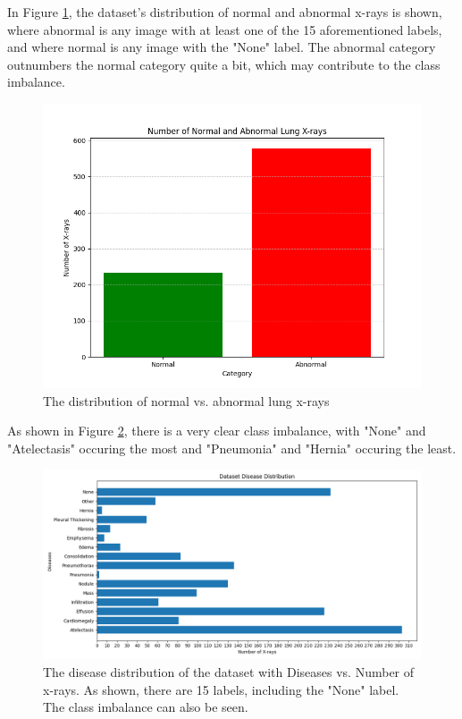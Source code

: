 \documentclass{article}
\theoremstyle{plain}
\theoremstyle{definition}
\theoremstyle{remark}
\begin{document}
In Figure \ref{fig:normalvabnormal}, the dataset's distribution of normal and abnormal x-rays is shown,
where abnormal is any image with at least one of the 15 aforementioned labels, and where
normal is any image with the "None" label. The abnormal category outnumbers the normal category quite
a bit, which may contribute to the class imbalance.

\begin{figure}[!h]
    \centering
    \includegraphics[scale=0.405]{normal_vs_abnormal}
    \caption{The distribution of normal vs. abnormal lung x-rays}
    \label{fig:normalvabnormal}
\end{figure}

As shown in Figure \ref{fig:datasetdistribution}, there is a very clear class imbalance, with "None"
and "Atelectasis" occuring the most and "Pneumonia" and "Hernia" occuring the least. 

\begin{figure}[!h]
    \centering
    \includegraphics[scale=0.55]{disease_distr}
    \caption{The disease distribution of the dataset with Diseases vs. Number of x-rays.
    As shown, there are 15 labels, including the "None" label. The class imbalance can also be seen.}
    \label{fig:datasetdistribution}
\end{figure}
\end{document}
